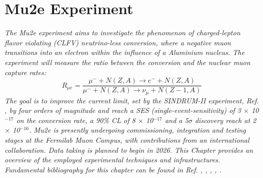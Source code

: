 \chapter{Mu2e Experiment}
\textit{
The Mu2e experiment aims to investigate the phenomenon of charged-lepton flavor violating (CLFV) neutrino-less conversion, where a negative muon transitions into an electron within the influence of a Aluminium nucleus. The experiment will measure the ratio between the conversion and the nuclear muon capture rates:
\begin{equation}\label{rmue}
R_{\mu e}=\frac{\mu^{-}+N(Z, A) \rightarrow e^{-}+N(Z, A)}{\mu^{-}+N(Z, A) \rightarrow \nu_\mu+N(Z-1, A)}
\end{equation}
The goal is to improve the current limit, set by the SINDRUM-II experiment, Ref. \cite{SINDRUMII:2006dvw}, by
four orders of magnitude and reach a SES (single-event-sensitivity) of 3 $\times$ 10$^{-17}$ on the
conversion rate, a 90\% CL of 8 $\times$ 10$^{-17}$ and a 5$\sigma$ discovery reach at 2 $\times$ 10$^{-16}$.
Mu2e is presently undergoing commissioning, integration and testing stages at the Fermilab Muon Campus, with contributions from an international collaboration. Data taking is planned to begin in 2026. This Chapter provides an overview of the employed experimental techniques and infrastructures. Fundamental bibliography for this chapter can be found in Ref. \cite{bartoszek2015mu2e}, \cite{bobbb}, \cite{Bernstein_2013}, \cite{Kargiantoulakis_2020}, \cite{universe9010054}.}
